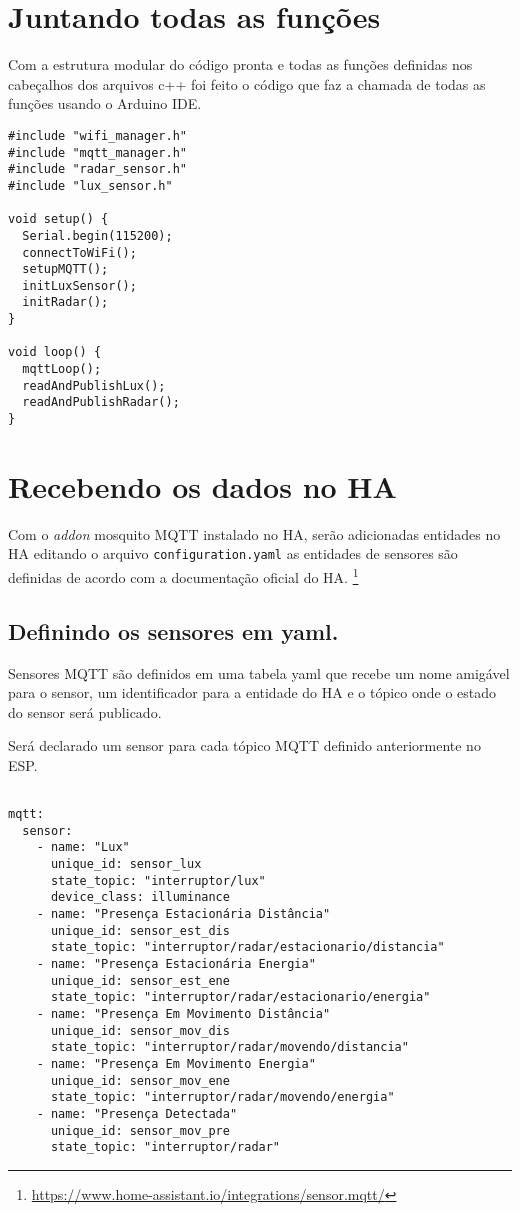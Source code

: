 \documentclass[]{abntex2}
\begin{document}
\section{Juntando todas as funções}
Com a estrutura modular do código pronta e todas as funções definidas nos
cabeçalhos dos arquivos c++ foi feito o código que faz a chamada de todas as
funções usando o Arduino IDE.
\begin{verbatim}
#include "wifi_manager.h"
#include "mqtt_manager.h"
#include "radar_sensor.h"
#include "lux_sensor.h"

void setup() {
  Serial.begin(115200);
  connectToWiFi();
  setupMQTT();
  initLuxSensor();
  initRadar();
}

void loop() {
  mqttLoop();
  readAndPublishLux();
  readAndPublishRadar();
}
\end{verbatim}

\section{Recebendo os dados no HA}
 Com o \textit{addon} mosquito MQTT instalado no HA, serão adicionadas entidades
 no HA editando o arquivo \texttt{configuration.yaml} as entidades de sensores
 são definidas de acordo com a documentação oficial do HA.
 \footnote{\url{https://www.home-assistant.io/integrations/sensor.mqtt/}}

 \subsection{Definindo os sensores em yaml.}
 Sensores MQTT são definidos em uma tabela yaml que recebe um nome amigável para
 o sensor, um identificador para a entidade do HA e o tópico onde o estado do
 sensor será publicado.

 Será declarado um sensor para cada tópico MQTT definido anteriormente no ESP.

 \begin{verbatim}

mqtt:
  sensor:
    - name: "Lux"
      unique_id: sensor_lux
      state_topic: "interruptor/lux"
      device_class: illuminance
    - name: "Presença Estacionária Distância"
      unique_id: sensor_est_dis
      state_topic: "interruptor/radar/estacionario/distancia"
    - name: "Presença Estacionária Energia"
      unique_id: sensor_est_ene
      state_topic: "interruptor/radar/estacionario/energia"
    - name: "Presença Em Movimento Distância"
      unique_id: sensor_mov_dis
      state_topic: "interruptor/radar/movendo/distancia"
    - name: "Presença Em Movimento Energia"
      unique_id: sensor_mov_ene
      state_topic: "interruptor/radar/movendo/energia"
    - name: "Presença Detectada"
      unique_id: sensor_mov_pre
      state_topic: "interruptor/radar"
\end{verbatim}
\end{document}
